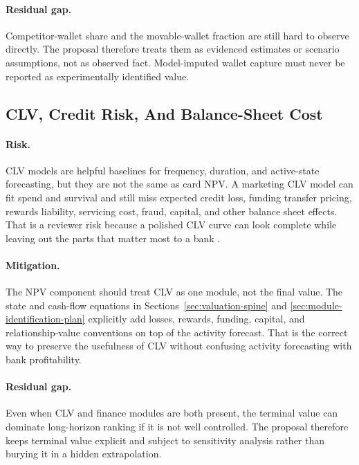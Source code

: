 \documentclass[11pt]{article}
\newcommand{\1}{\mathbf{1}}
\begin{document}
\paragraph{Residual gap.}
Competitor-wallet share and the movable-wallet fraction are still hard to
observe directly. The proposal therefore treats them as evidenced estimates or
scenario assumptions, not as observed fact. Model-imputed wallet capture must
never be reported as experimentally identified value.

\subsection{CLV, Credit Risk, And Balance-Sheet Cost}

\paragraph{Risk.}
CLV models are helpful baselines for frequency, duration, and active-state
forecasting, but they are not the same as card NPV. A marketing CLV model can
fit spend and survival and still miss expected credit loss, funding transfer
pricing, rewards liability, servicing cost, fraud, capital, and other balance
sheet effects. That is a reviewer risk because a polished CLV curve can look
complete while leaving out the parts that matter most to a bank
\citep{berger1998clv,rust2004return,venkatesan2004clv,schmittlein1987counting,
fader2005bgnbd,bolton1998duration}.

\paragraph{Mitigation.}
The NPV component should treat CLV as one module, not the final value. The
state and cash-flow equations in Sections~\ref{sec:valuation-spine} and
\ref{sec:module-identification-plan} explicitly add losses, rewards, funding,
capital, and relationship-value conventions on top of the activity forecast.
That is the correct way to preserve the usefulness of CLV without confusing
activity forecasting with bank profitability.

\paragraph{Residual gap.}
Even when CLV and finance modules are both present, the terminal value can
dominate long-horizon ranking if it is not well controlled. The proposal
therefore keeps terminal value explicit and subject to sensitivity analysis
rather than burying it in a hidden extrapolation.
\end{document}
